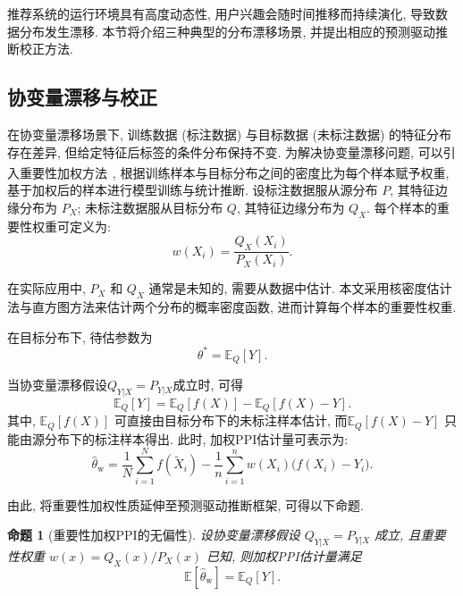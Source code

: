 \documentclass[a4paper, AutoFakeBold, UTF8]{ctexrep}
\theoremstyle{plain}
\newtheorem{prop}{命题}[chapter]
\newcommand{\upcite}[1]
{\textsuperscript{~\cite{#1}}}
\numberwithin{equation}{chapter}
\begin{document}
推荐系统的运行环境具有高度动态性, 用户兴趣会随时间推移而持续演化, 导致数据分布发生漂移. 本节将介绍三种典型的分布漂移场景, 并提出相应的预测驱动推断校正方法. 

\subsection{协变量漂移与校正}

在协变量漂移场景下, 训练数据 (标注数据) 与目标数据 (未标注数据) 的特征分布存在差异, 但给定特征后标签的条件分布保持不变. 为解决协变量漂移问题, 可以引入重要性加权方法\upcite{Sugiyama2007}, 根据训练样本与目标分布之间的密度比为每个样本赋予权重, 基于加权后的样本进行模型训练与统计推断. 设标注数据服从源分布 $P$, 其特征边缘分布为 $P_X$; 未标注数据服从目标分布 $Q$, 其特征边缘分布为 $Q_X$. 每个样本的重要性权重可定义为: 
\begin{equation}
w (X_i)  = \frac{Q_X (X_i) }{P_X (X_i) }. \label{eq: weight}
\end{equation}

在实际应用中, $P_X$ 和 $Q_X$ 通常是未知的, 需要从数据中估计. 本文采用核密度估计法与直方图方法来估计两个分布的概率密度函数, 进而计算每个样本的重要性权重. 

在目标分布下, 待估参数为
\[
\theta^*=\mathbb{E}_Q[Y].
\]

当协变量漂移假设$Q_{Y|X}=P_{Y|X}$成立时, 可得
\[
\mathbb{E}_Q[Y]
=
\mathbb{E}_Q[f (X) ]
-
\mathbb{E}_Q[f (X) -Y].
\]
其中, $\mathbb{E}_Q[f (X) ]$ 可直接由目标分布下的未标注样本估计, 而$\mathbb{E}_Q[f (X) -Y]$ 只能由源分布下的标注样本得出. 此时, 加权PPI估计量可表示为: 
\begin{equation}
\hat{\theta}_{\text{w}} 
= 
\frac{1}{N}\sum_{i=1}^{N} f (\tilde{X}_i)  
-
\frac{1}{n}\sum_{i=1}^{n} w (X_i)  \bigl (f (X_i)  - Y_i\bigr). 
\label{eq: theta_w}
\end{equation}

由此, 将重要性加权性质延伸至预测驱动推断框架, 可得以下命题. 
\begin{prop}[重要性加权PPI的无偏性]
\label{prop: covariate_shift}
设协变量漂移假设 $Q_{Y|X}=P_{Y|X}$ 成立, 且重要性权重 $w (x) =Q_X (x) /P_X (x) $ 已知, 则加权PPI估计量满足
\begin{equation}
\mathbb{E}[\hat{\theta}_{\text{w}}] = \mathbb{E}_Q[Y].
\label{eq: w_unbiased}
\end{equation}
\end{prop}
\end{document}
